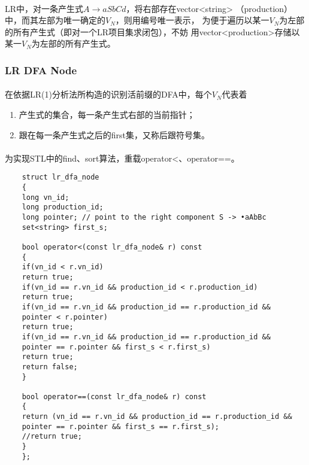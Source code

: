 \documentclass[UTF8]{ctexart}
\begin{document}
	\paragraph{} %
	LR中，对一条产生式$A \rightarrow aSbCd$，将右部存在vector<string>
	（production）中，而其左部为唯一确定的$V_N$，则用编号唯一表示，
	为便于遍历以某一$V_N$为左部的所有产生式（即对一个LR项目集求闭包），不妨
	用vector<production>存储以某一$V_N$为左部的所有产生式。
	\subsubsection{LR DFA Node} %
	\label{ssub:lr_dfa_node}
	\paragraph{} %
	在依据LR(1)分析法所构造的识别活前缀的DFA中，每个$V_N$代表着
	\begin{enumerate}
		\item 产生式的集合，每一条产生式右部的当前指针；
		\item 跟在每一条产生式之后的first集，又称后跟符号集。
	\end{enumerate}
	\paragraph{} %
	为实现STL中的find、sort算法，重载operator<、operator==。
	\begin{lstlisting}
	struct lr_dfa_node
	{
	long vn_id;
	long production_id;
	long pointer; // point to the right component S -> •aAbBc
	set<string> first_s;
	
	bool operator<(const lr_dfa_node& r) const
	{
	if(vn_id < r.vn_id)
	return true;
	if(vn_id == r.vn_id && production_id < r.production_id)
	return true;
	if(vn_id == r.vn_id && production_id == r.production_id &&
	pointer < r.pointer)
	return true;
	if(vn_id == r.vn_id && production_id == r.production_id &&
	pointer == r.pointer && first_s < r.first_s)
	return true;
	return false;
	}
	
	bool operator==(const lr_dfa_node& r) const
	{
	return (vn_id == r.vn_id && production_id == r.production_id &&
	pointer == r.pointer && first_s == r.first_s);
	//return true;
	}
	};
	\end{lstlisting}
	
\end{document}
